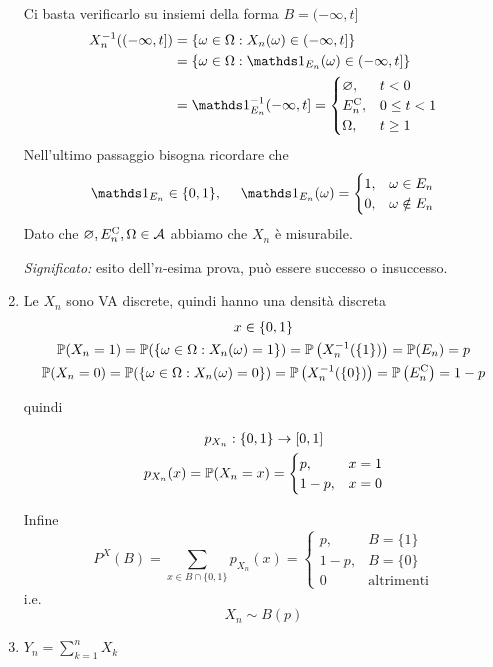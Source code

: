 \begin{enumerate}
Ci basta verificarlo su insiemi della forma $B=( -\infty ,t]$
\begin{align*}
X_{n}^{-1}((-\infty ,t]) & =\{\omega \in \Omega :X_{n}(\omega) \in ( -\infty ,t]\}\\
 & =\{\omega \in \Omega :\Ind_{E_{n}}(\omega) \in ( -\infty ,t]\}\\
 & =\Ind_{E_{n}}^{-1}( -\infty ,t] =
\begin{cases}
\emptyset , & t< 0\\
E_{n}\comp , & 0\leq t< 1\\
\Omega , & t\geq 1
\end{cases}
\end{align*}
Nell'ultimo passaggio bisogna ricordare che
\begin{equation*}
\Ind_{E_{n}} \in \{0,1\} ,\ \ \ \ \Ind_{E_{n}}(\omega) =
\begin{cases}
1, & \omega \in E_{n}\\
0, & \omega \notin E_{n}
\end{cases}
\end{equation*}
Dato che $\varnothing ,E_{n}^{\mathrm{C}} ,\Omega \in \mathcal{A}$ abbiamo che $X_{n}$ è misurabile.

\textit{Significato:} esito dell'$n$-esima prova, può essere successo o insuccesso.
\item Le $X_{n}$ sono VA discrete, quindi hanno una densità discreta
\begin{gather*}
x\in \{0,1\}\\
\mathbb{P}(X_{n} =1) =\mathbb{P}(\{\omega \in \Omega :X_{n}(\omega) =1\}) =\mathbb{P}\left(X_{n}^{-1}(\{1\})\right) =\mathbb{P}(E_{n}) =p\\
\mathbb{P}(X_{n} =0) =\mathbb{P}(\{\omega \in \Omega :X_{n}(\omega) =0\}) =\mathbb{P}\left(X_{n}^{-1}(\{0\})\right) =\mathbb{P}\left(E_{n}^{\mathrm{C}}\right) =1-p
\end{gather*}

quindi

\begin{gather*}
p_{X_{n}} :\{0,1\}\rightarrow [0,1]\\
p_{X_{n}}(x) =\mathbb{P}(X_{n} =x) =
\begin{cases}
p, & x=1\\
1-p, & x=0
\end{cases}
\end{gather*}

Infine
\begin{equation*}
P^{X}(B) =\sum\limits_{x\in B\cap \{0,1\}} p_{X_{n}}(x) =
\begin{cases}
p, & B=\{1\}\\
1-p, & B=\{0\}\\
0 & \text{altrimenti}
\end{cases}
\end{equation*}
i.e.
\begin{equation*}
\boxed{X_{n} \sim B(p)}
\end{equation*}
\item $Y_{n} =\sum\limits_{k=1}^{n} X_{k}$


\end{enumerate}
